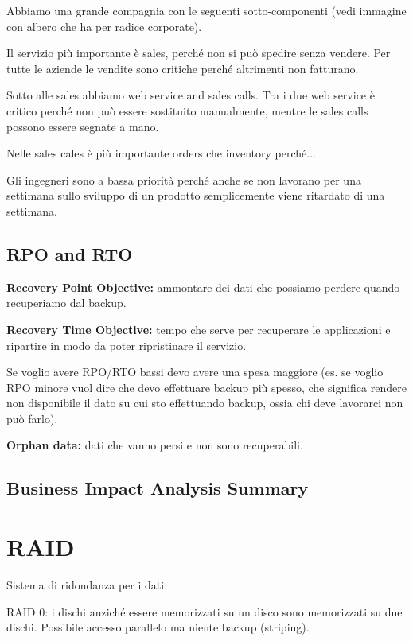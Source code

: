 Abbiamo una grande compagnia con le seguenti sotto-componenti (vedi immagine con 
albero che ha per radice corporate).

Il servizio più importante è sales, perché non si può spedire senza vendere. 
Per tutte le aziende le vendite sono critiche perché altrimenti non fatturano.

Sotto alle sales abbiamo web service and sales calls. Tra i due web service è 
critico perché non può essere sostituito manualmente, mentre le sales calls 
possono essere segnate a mano.

Nelle sales cales è più importante orders che inventory perché...

Gli ingegneri sono a bassa priorità perché anche se non lavorano per una 
settimana sullo sviluppo di un prodotto semplicemente viene ritardato di una 
settimana.

\subsection{RPO and RTO}

\textbf{Recovery Point Objective:} ammontare dei dati che possiamo perdere 
quando recuperiamo dal backup.

\textbf{Recovery Time Objective:} tempo che serve per recuperare le 
applicazioni e ripartire in modo da poter ripristinare il servizio.

Se voglio avere RPO/RTO bassi devo avere una spesa maggiore (es. se voglio RPO 
minore vuol dire che devo effettuare backup più spesso, che significa rendere 
non disponibile il dato su cui sto effettuando backup, ossia chi deve lavorarci 
non può farlo).

\textbf{Orphan data:} dati che vanno persi e non sono recuperabili.

\subsection{Business Impact Analysis Summary}


\section{RAID}

Sistema di ridondanza per i dati.

RAID 0: i dischi anziché essere memorizzati su un disco sono memorizzati su due 
dischi. Possibile accesso parallelo ma niente backup (striping).

